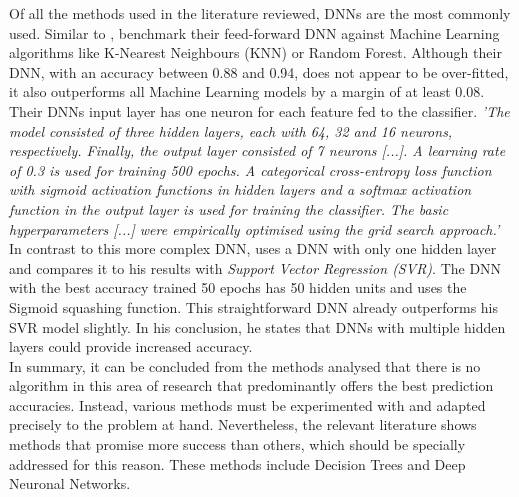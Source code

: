 Of all the methods used in the literature reviewed, DNNs are the most commonly used. Similar to \citet{deng_analysis_2020}, \citet{bhateja_analysis_2021} benchmark their feed-forward DNN against Machine Learning algorithms like K-Nearest Neighbours (KNN) or Random Forest. Although their DNN, with an accuracy between 0.88 and 0.94, does not appear to be over-fitted, it also outperforms all Machine Learning models by a margin of at least 0.08. Their DNNs input layer has one neuron for each feature fed to the classifier. \emph{'The model consisted of three hidden layers, each with 64, 32 and 16 neurons, respectively. Finally, the output layer consisted of 7 neurons [...]. A learning rate of 0.3 is used for training 500 epochs. A categorical cross-entropy loss function with sigmoid activation functions in hidden layers and a softmax activation function in the output layer is used for training the classifier. The basic hyperparameters [...] were empirically optimised using the grid search approach.'} \parencite[, p. 7]{bhateja_analysis_2021} In contrast to this more complex DNN, \citet{lutz_fantasy_2015} uses a DNN with only one hidden layer and compares it to his results with \emph{Support Vector Regression (SVR)}. The DNN with the best accuracy trained 50 epochs has 50 hidden units and uses the Sigmoid squashing function. This straightforward DNN already outperforms his SVR model slightly. In his conclusion, he states that DNNs with multiple hidden layers could provide increased accuracy. \parencite[cf.][, p. 5]{lutz_fantasy_2015} \\
\indent In summary, it can be concluded from the methods analysed that there is no algorithm in this area of research that predominantly offers the best prediction accuracies. Instead, various methods must be experimented with and adapted precisely to the problem at hand. Nevertheless, the relevant literature shows methods that promise more success than others, which should be specially addressed for this reason. These methods include Decision Trees and Deep Neuronal Networks.

